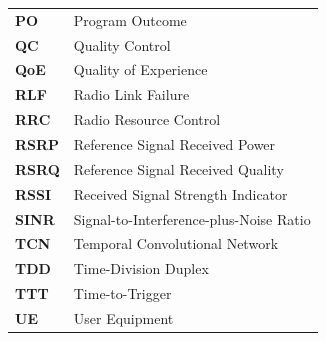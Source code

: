 \begin{longtable}{p{3.0cm} p{11.5cm}}
\textbf{PO} & Program Outcome \\
\textbf{QC} & Quality Control \\
\textbf{QoE} & Quality of Experience \\
\textbf{RLF} & Radio Link Failure \\
\textbf{RRC} & Radio Resource Control \\
\textbf{RSRP} & Reference Signal Received Power \\
\textbf{RSRQ} & Reference Signal Received Quality \\
\textbf{RSSI} & Received Signal Strength Indicator \\
\textbf{SINR} & Signal-to-Interference-plus-Noise Ratio \\
\textbf{TCN} & Temporal Convolutional Network \\
\textbf{TDD} & Time-Division Duplex \\
\textbf{TTT} & Time-to-Trigger \\
\textbf{UE} & User Equipment \\
\bottomrule
\end{longtable}
\onehalfspacing
